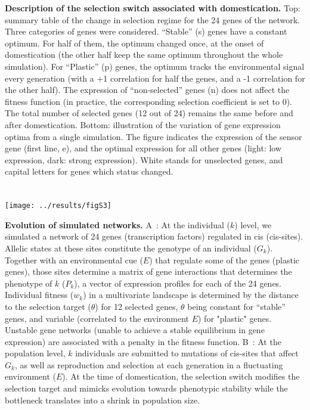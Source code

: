 \documentclass[10pt,a4paper]{article}
\begin{document}
\vspace{2cm}

\textbf{Description of the selection switch associated with domestication.} Top: summary table of the change in selection regime for the 24 genes of the network. Three categories of genes were considered. “Stable” (s) genes have a constant optimum. For half of them, the optimum changed once, at the onset of domestication (the other half keep the same optimum throughout the whole simulation). For “Plastic” (p) genes, the optimum tracks the environmental signal every generation (with a +1 correlation for half the genes, and a -1 correlation for the other half). The expression of “non-selected” genes (n) does not affect the fitness function (in practice, the corresponding selection coefficient is set to 0). The total number of selected genes (12 out of 24) remains the same before and after domestication. Bottom: illustration of the variation of gene expression optima from a single simulation. The figure indicates the expression of the sensor gene (first line, e), and the optimal expression for all other genes (light: low expression, dark: strong expression). White stands for unselected genes, and capital letters for genes which status changed. 

\clearpage

\section{}

\begin{center}
\texttt{[image: ../results/figS3]}
\end{center}

\textbf{Evolution of simulated networks.}
A : At the individual ($k$) level, we simulated a network of 24 genes (transcription factors) regulated in cis (cis-sites). 
Allelic states at these  sites constitute the genotype of an individual ($G_k$). Together with an environmental cue ($E$) that regulate some of the genes (plastic genes), those sites determine a matrix of gene interactions that determines the phenotype of $k$ ($P_k$), a vector of expression profiles for each of the 24 genes. Individual fitness ($w_k$) in a multivariate landscape is determined by the distance to the selection target ($\theta$) for 12 selected genes, $\theta$ being constant for “stable” genes, and variable (correlated to the environment $E$) for "plastic" genes. Unstable gene networks (unable to achieve a stable equilibrium in gene expression) are associated with a penalty in the fitness function. 
B : At the population level, $k$ individuals are submitted to mutations of cis-sites that affect $G_k$, as well as reproduction and selection at each generation in a fluctuating environment ($E$). At the time of domestication, the selection switch modifies the selection target and mimicks evolution towards phenotypic stability while the bottleneck translates into a shrink in population size.
\end{document}
